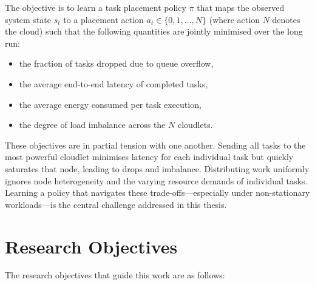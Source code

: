 The objective is to learn a task placement policy $\pi$ that maps the
observed system state $s_t$ to a placement action $a_t \in
\{0, 1, \ldots, N\}$ (where action $N$ denotes the cloud) such that
the following quantities are jointly minimised over the long run:

\begin{itemize}
  \item the fraction of tasks dropped due to queue overflow,
  \item the average end-to-end latency of completed tasks,
  \item the average energy consumed per task execution,
  \item the degree of load imbalance across the $N$ cloudlets.
\end{itemize}

These objectives are in partial tension with one another. Sending all
tasks to the most powerful cloudlet minimises latency for each
individual task but quickly saturates that node, leading to drops and
imbalance. Distributing work uniformly ignores node heterogeneity and
the varying resource demands of individual tasks. Learning a policy
that navigates these trade-offs---especially under non-stationary
workloads---is the central challenge addressed in this thesis.

\section{Research Objectives}
\label{sec:objectives}

The research objectives that guide this work are as follows:

